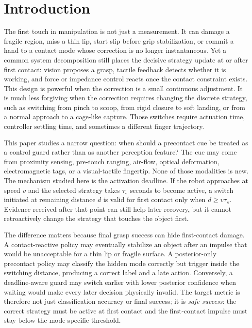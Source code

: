 \documentclass{article}
\begin{document}
\section{Introduction}

The first touch in manipulation is not just a measurement. It can damage a fragile region, miss a thin lip, start slip before grip stabilization, or commit a hand to a contact mode whose correction is no longer instantaneous. Yet a common system decomposition still places the decisive strategy update at or after first contact: vision proposes a grasp, tactile feedback detects whether it is working, and force or impedance control reacts once the contact constraint exists. This design is powerful when the correction is a small continuous adjustment. It is much less forgiving when the correction requires changing the discrete strategy, such as switching from pinch to scoop, from rigid closure to soft landing, or from a normal approach to a cage-like capture. Those switches require actuation time, controller settling time, and sometimes a different finger trajectory.

This paper studies a narrow question: when should a precontact cue be treated as a control guard rather than as another perception feature? The cue may come from proximity sensing, pre-touch ranging, air-flow, optical deformation, electromagnetic tags, or a visual-tactile fingertip. None of those modalities is new. The mechanism studied here is the activation deadline. If the robot approaches at speed $v$ and the selected strategy takes $\tau_s$ seconds to become active, a switch initiated at remaining distance $d$ is valid for first contact only when $d \geq v\tau_s$. Evidence received after that point can still help later recovery, but it cannot retroactively change the strategy that touches the object first.

The difference matters because final grasp success can hide first-contact damage. A contact-reactive policy may eventually stabilize an object after an impulse that would be unacceptable for a thin lip or fragile surface. A posterior-only precontact policy may classify the hidden mode correctly but trigger inside the switching distance, producing a correct label and a late action. Conversely, a deadline-aware guard may switch earlier with lower posterior confidence when waiting would make every later decision physically invalid. The target metric is therefore not just classification accuracy or final success; it is \emph{safe success}: the correct strategy must be active at first contact and the first-contact impulse must stay below the mode-specific threshold.
\end{document}
